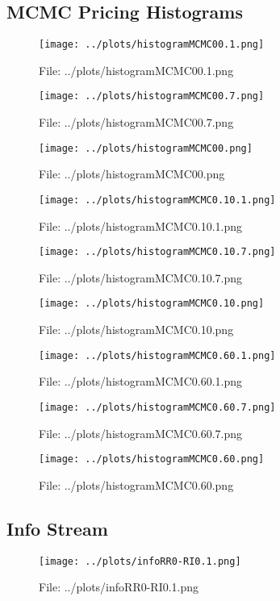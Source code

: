 \documentclass[a4paper, 11pt]{report}
\let\Oldsubsection\subsection
\renewcommand{\subsection}{\FloatBarrier\Oldsubsection}
\begin{document}
\subsection{MCMC Pricing Histograms}
\begin{figure}[h!] \caption{File: ../plots/histogramMCMC00.1.png} \texttt{[image: ../plots/histogramMCMC00.1.png]} \end{figure}
\begin{figure}[h!] \caption{File: ../plots/histogramMCMC00.7.png} \texttt{[image: ../plots/histogramMCMC00.7.png]} \end{figure}
\begin{figure}[h!] \caption{File: ../plots/histogramMCMC00.png} \texttt{[image: ../plots/histogramMCMC00.png]} \end{figure}
\begin{figure}[h!] \caption{File: ../plots/histogramMCMC0.10.1.png} \texttt{[image: ../plots/histogramMCMC0.10.1.png]} \end{figure}
\begin{figure}[h!] \caption{File: ../plots/histogramMCMC0.10.7.png} \texttt{[image: ../plots/histogramMCMC0.10.7.png]} \end{figure}
\begin{figure}[h!] \caption{File: ../plots/histogramMCMC0.10.png} \texttt{[image: ../plots/histogramMCMC0.10.png]} \end{figure}
\begin{figure}[h!] \caption{File: ../plots/histogramMCMC0.60.1.png} \texttt{[image: ../plots/histogramMCMC0.60.1.png]} \end{figure}
\begin{figure}[h!] \caption{File: ../plots/histogramMCMC0.60.7.png} \texttt{[image: ../plots/histogramMCMC0.60.7.png]} \end{figure}
\begin{figure}[h!] \caption{File: ../plots/histogramMCMC0.60.png} \texttt{[image: ../plots/histogramMCMC0.60.png]} \end{figure}


\subsection{Info Stream}
\begin{figure}[h!] \caption{File: ../plots/infoRR0-RI0.1.png} \texttt{[image: ../plots/infoRR0-RI0.1.png]} \end{figure}
\end{document}
